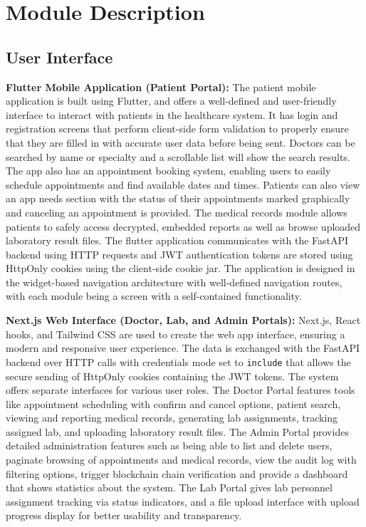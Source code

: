 \documentclass[a4paper,12pt]{report}
\begin{document}
\section{Module Description}

\subsection{User Interface}
\textbf{Flutter Mobile Application (Patient Portal):}
The patient mobile application is built using Flutter, and offers a well-defined and user-friendly interface to interact with patients in the healthcare system. It has login and registration screens that perform client-side form validation to properly ensure that they are filled in with accurate user data before being sent. Doctors can be searched by name or specialty and a scrollable list will show the search results. The app also has an appointment booking system, enabling users to easily schedule appointments and find available dates and times. Patients can also view an app needs section with the status of their appointments marked graphically and canceling an appointment is provided. The medical records module allows patients to safely access decrypted, embedded reports as well as browse uploaded laboratory result files. The flutter application communicates with the FastAPI backend using HTTP requests and JWT authentication tokens are stored using HttpOnly cookies using the client-side cookie jar. The application is designed in the widget-based navigation architecture with well-defined navigation routes, with each module being a screen with a self-contained functionality.


\textbf{Next.js Web Interface (Doctor, Lab, and Admin Portals):}
Next.js, React hooks, and Tailwind CSS are used to create the web app interface, ensuring a modern and responsive user experience. The data is exchanged with the FastAPI backend over HTTP calls with credentials mode set to \texttt{include} that allows the secure sending of HttpOnly cookies containing the JWT tokens. The system offers separate interfaces for various user roles. The Doctor Portal features tools like appointment scheduling with confirm and cancel options, patient search, viewing and reporting medical records, generating lab assignments, tracking assigned lab, and uploading laboratory result files. The Admin Portal provides detailed administration features such as being able to list and delete users, paginate browsing of appointments and medical records, view the audit log with filtering options, trigger blockchain chain verification and provide a dashboard that shows statistics about the system. The Lab Portal gives lab personnel assignment tracking via status indicators, and a file upload interface with upload progress display for better usability and transparency.
\end{document}
